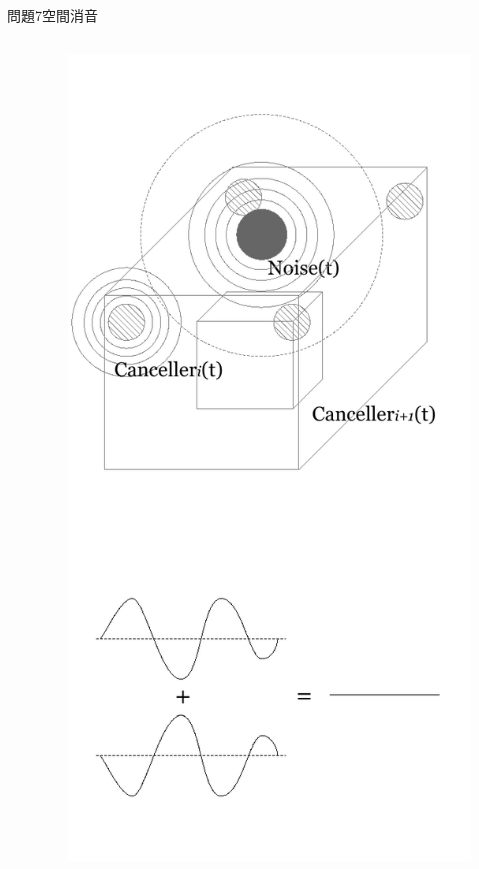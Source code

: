 \documentclass[dvipdfmx]{beamer}
\begin{document}
\begin{frame}{問題7}{空間消音}
\begin{columns}[t]
\begin{column}{0.7\textwidth}
\end{column}
\begin{column}{0.3\textwidth}
\begin{figure}[htbp]
    \centering
    \includegraphics[bb=0mm 0mm 100.0mm 170.0mm, scale=0.35, type=pdf]{img/problem7.pdf}
\end{figure}
\end{column}
\end{columns}
\end{frame}
\end{document}
